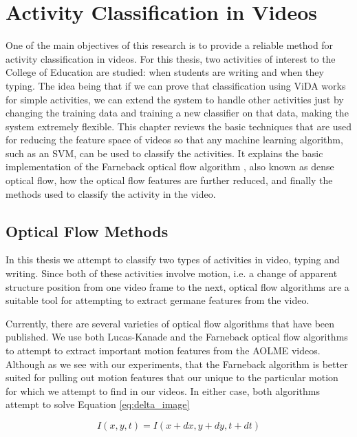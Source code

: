 \chapter{Activity Classification in Videos}
One of the main objectives of this research is to provide a reliable method for
activity classification in videos. For this thesis, two activities of interest
to the College of Education are studied: when students are writing and when they
typing. The idea being that if we can prove that classification using ViDA works
for simple activities, we can extend the system to handle other activities just
by changing the training data and training a new classifier on that data, making
the system extremely flexible. This chapter reviews the basic techniques that
are used for reducing the feature space of videos so that any machine learning
algorithm, such as an SVM, can be used to classify the activities. It explains
the basic implementation of the Farneback optical flow algorithm
\cite{farneback2003two}, also known as dense optical flow, how the optical flow
features are further reduced, and finally the methods used to classify the
activity in the video.

\section{\label{section:optical_flow_methods}Optical Flow Methods}
In this thesis we attempt to classify two types of activities in video,  typing
and writing. Since both of these activities involve motion, i.e. a change of
apparent structure position from one video frame to the next, optical flow
algorithms  are a suitable tool for attempting to extract germane features from
the video.

Currently, there are several varieties of optical flow algorithms that have been
published. We use both Lucas-Kanade \cite{lucas1981iterative} and the Farneback
\cite{farneback2003two}  optical flow algorithms to attempt to extract
important motion features from the AOLME videos. Although as we see with our
experiments, that the Farneback algorithm is better suited for pulling out
motion features that our unique to the particular motion for which we attempt
to find in our videos. In either case, both algorithms attempt to solve
Equation \ref{eq:delta_image}

\begin{equation}
I(x,y,t) = I(x+dx, y+dy, t+dt)
\label{eq:delta_image}
\end{equation}

